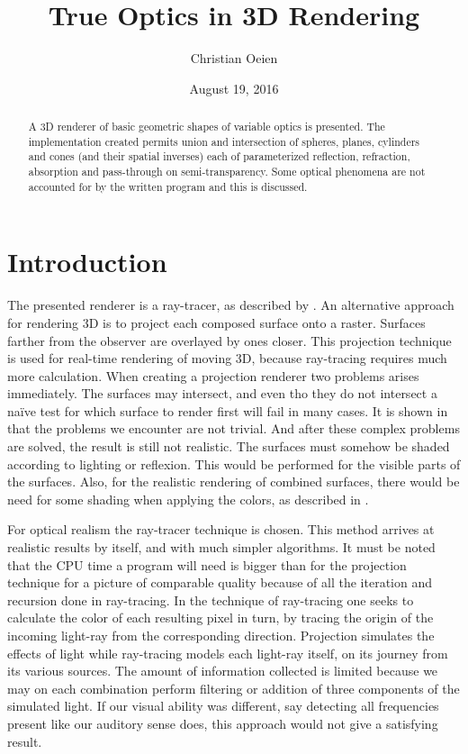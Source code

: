 \documentclass{article}
\begin{document}
\title{True Optics in 3D Rendering}
\author{Christian Oeien}
\date{August 19, 2016}
\maketitle

\begin{abstract}
A 3D renderer of basic geometric shapes of variable optics is presented.
The implementation created permits union and
intersection of spheres, planes, cylinders and cones
(and their spatial inverses)
each of parameterized reflection, refraction,
absorption and pass-through on semi-transparency.
Some optical phenomena are not accounted for by
the written program and this is discussed.
\end{abstract}

\section{Introduction}

The presented renderer is a ray-tracer, as described by \cite{raytrace}.
An alternative approach for rendering 3D is to project
each composed surface onto a raster.
Surfaces farther from the observer are overlayed by ones closer.
This projection technique is used for real-time rendering of moving 3D,
because ray-tracing requires much more calculation.
When creating a projection renderer two
problems arises immediately.  The surfaces may intersect, and even
tho they do not intersect a na{\"i}ve test for which surface to render first will fail
in many cases.  It is shown in \cite{linehide}
that the problems we encounter are not trivial.
And after these complex problems are solved, the result is still not
realistic.  The surfaces must somehow be shaded according to lighting
or reflexion.  This would be performed for the visible parts of the surfaces.
Also, for the realistic rendering of combined surfaces, there would be need for
some shading when applying the colors, as described in \cite{phongshade}.

For optical realism the ray-tracer technique is chosen.
This method arrives at realistic results
by itself, and with much simpler algorithms.
It must be noted that the CPU time
a program will need is bigger than for the projection technique for a picture
of comparable quality because of all the iteration and recursion done in ray-tracing.
In the technique of ray-tracing one seeks to calculate the color of each resulting pixel
in turn, by tracing the origin of the incoming light-ray from the corresponding direction.
Projection simulates the effects of light while
ray-tracing models each light-ray itself, on its journey from its
various sources.  The amount of information collected is limited because we
may on each combination perform filtering or addition of three components
of the simulated light.
If our visual ability was different, say
detecting all frequencies present like our auditory sense does, this
approach would not give a satisfying result.
\end{document}
